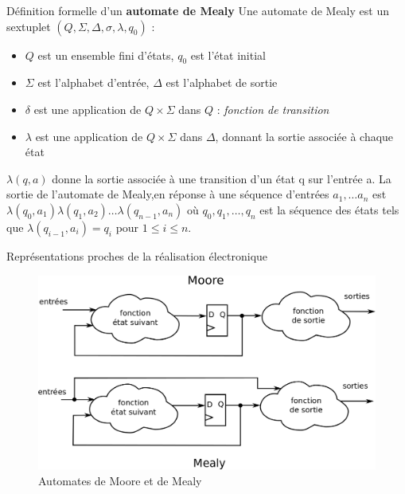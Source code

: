 \documentclass[xcolor=table]{beamer}
\begin{document}
\begin{frame}{Définition formelle d'un \textbf{automate de Mealy}}
  Une automate de Mealy est un sextuplet $(Q, \Sigma, \Delta, \sigma, \lambda, q_0 )$ :
  \begin{itemize}
  \item $Q$ est un ensemble fini d’états, $q_0$ est l’état initial
  \item $\Sigma$ est l’alphabet d’entrée, $\Delta$ est l’alphabet de sortie
  \item $\delta$ est une application de $Q \times \Sigma $ dans $Q$ : {\it fonction de transition}
  \item $\lambda$  est une application de $Q\times \Sigma$ dans $\Delta$, donnant la sortie associée à chaque état
  \end{itemize}

  $\lambda(q, a)$ donne la sortie associée à une transition d’un état q sur l’entrée a.
  La sortie de l'automate de Mealy,en réponse à une séquence d’entrées $a_1,\dots a_n$ est
  $\lambda(q_0, a_1) \lambda(q_1 , a_2 ) \dots \lambda(q_{n-1}, a_n)$
  où $q_0 , q_1 ,\dots, q_n$ est la séquence des états tels que
  $\lambda(q_{i-1}, a_i) = q_i$ pour $1 \leq i \leq n$.
\end{frame}

\begin{frame}{Représentations proches de la réalisation électronique}
  \begin{figure}[h!]
    \centering
    \includegraphics[scale=0.20]{../../POLY/figures/moore_mealy.png}
    \caption{Automates de Moore et de Mealy}
    \label{fig:mealy_moore}
  \end{figure}
\end{frame}
\end{document}
